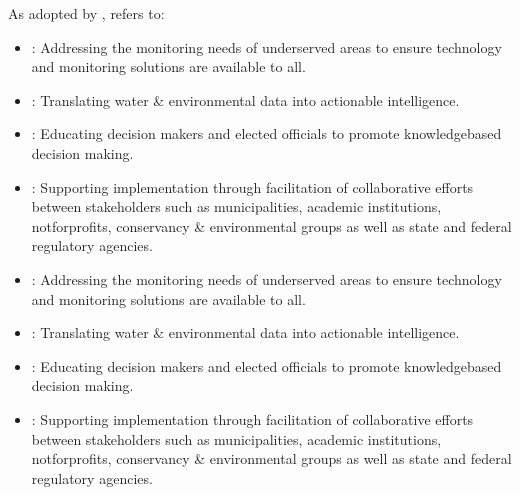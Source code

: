 \documentclass[letterpaper,10pt,english]{sphinxmanual}
\begin{document}
\sphinxAtStartPar
As adopted by {\hyperref[\detokenize{glossary:term-REON}]{}}, {\hyperref[\detokenize{glossary:term-DIKW}]{}} refers to:
\begin{itemize}
\item {} 
\sphinxAtStartPar
{}: Addressing the monitoring needs of under\sphinxhyphen{}served areas to ensure technology and monitoring solutions are available to all.

\item {} 
\sphinxAtStartPar
{}: Translating water \& environmental data into actionable intelligence.

\item {} 
\sphinxAtStartPar
{}: Educating decision makers and elected officials to promote knowledge\sphinxhyphen{}based decision making.

\item {} 
\sphinxAtStartPar
{}: Supporting implementation through facilitation of collaborative efforts between stakeholders such as municipalities, academic institutions, not\sphinxhyphen{}for\sphinxhyphen{}profits, conservancy \& environmental groups as well as state and federal regulatory agencies.

\end{itemize}
\begin{itemize}
\item {} 
\sphinxAtStartPar
{}: Addressing the monitoring needs of under\sphinxhyphen{}served areas to ensure technology and monitoring solutions are available to all.

\item {} 
\sphinxAtStartPar
{}: Translating water \& environmental data into actionable intelligence.

\item {} 
\sphinxAtStartPar
{}: Educating decision makers and elected officials to promote knowledge\sphinxhyphen{}based decision making.

\item {} 
\sphinxAtStartPar
{}: Supporting implementation through facilitation of collaborative efforts between stakeholders such as municipalities, academic institutions, not\sphinxhyphen{}for\sphinxhyphen{}profits, conservancy \& environmental groups as well as state and federal regulatory agencies.

\end{itemize}
\end{document}
